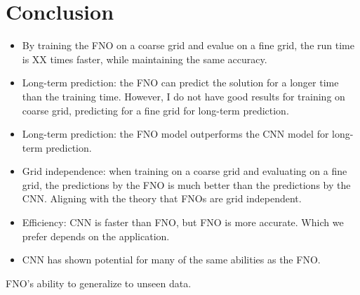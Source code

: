 \chapter{Conclusion}\label{ch:conclusion}


\begin{itemize}
    \item By training the FNO on a coarse grid and evalue on a fine grid, the run time is XX times faster, while maintaining the same accuracy.
    \item Long-term prediction: the FNO can predict the solution for a longer time than the training time. However, I do not have good results for training on coarse grid, predicting for a fine grid for long-term prediction.
    \item Long-term prediction: the FNO model outperforms the CNN model for long-term prediction.
    \item Grid independence: when training on a coarse grid and evaluating on a fine grid, the predictions by the FNO is much better than the predictions by the CNN. Aligning with the theory that FNOs are grid independent.
    \item Efficiency: CNN is faster than FNO, but FNO is more accurate. Which we prefer depends on the application.
    \item CNN has shown potential for many of the same abilities as the FNO.
\end{itemize}




FNO's ability to generalize to unseen data.
